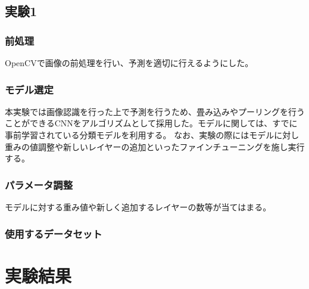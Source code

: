 \documentclass[a4paper, 11pt, titlepage]{jsarticle}
\begin{document}
\subsection{実験1}
\subsubsection{前処理}
OpenCVで画像の前処理を行い、予測を適切に行えるようにした。 \par

\subsubsection{モデル選定}
本実験では画像認識を行った上で予測を行うため、畳み込みやプーリングを行うことができるCNNをアルゴリズムとして採用した。モデルに関しては、すでに事前学習されている分類モデルを利用する。%
なお、実験の際にはモデルに対し重みの値調整や新しいレイヤーの追加といったファインチューニングを施し実行する。%

\subsubsection{パラメータ調整}
モデルに対する重み値や新しく追加するレイヤーの数等が当てはまる。%

\subsubsection{使用するデータセット}


\section{実験結果}
\end{document}
